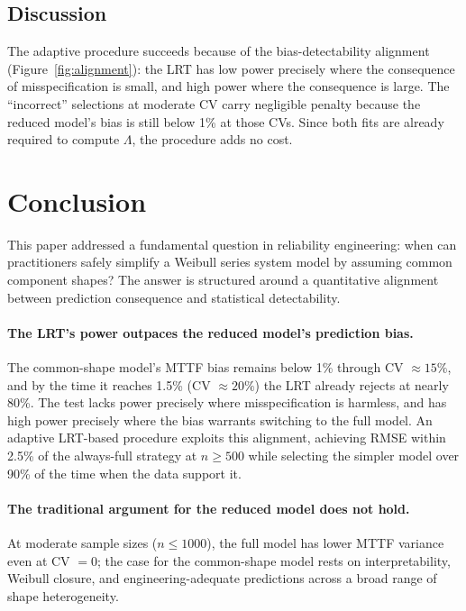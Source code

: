 \documentclass[11pt]{article}
\begin{document}
\subsection{Discussion}

The adaptive procedure succeeds because of the bias-detectability alignment (Figure~\ref{fig:alignment}): the LRT has low power precisely where the consequence of misspecification is small, and high power where the consequence is large. The ``incorrect'' selections at moderate CV carry negligible penalty because the reduced model's bias is still below 1\% at those CVs. Since both fits are already required to compute $\Lambda$, the procedure adds no cost.

\section{Conclusion}
\label{sec:conclusion}

This paper addressed a fundamental question in reliability engineering: when can practitioners safely simplify a Weibull series system model by assuming common component shapes? The answer is structured around a quantitative alignment between prediction consequence and statistical detectability.

\paragraph{The LRT's power outpaces the reduced model's prediction bias.}
The common-shape model's MTTF bias remains below 1\% through CV $\approx 15\%$, and by the time it reaches 1.5\% (CV $\approx 20\%$) the LRT already rejects at nearly 80\%. The test lacks power precisely where misspecification is harmless, and has high power precisely where the bias warrants switching to the full model. An adaptive LRT-based procedure exploits this alignment, achieving RMSE within 2.5\% of the always-full strategy at $n \geq 500$ while selecting the simpler model over 90\% of the time when the data support it.

\paragraph{The traditional argument for the reduced model does not hold.}
At moderate sample sizes ($n \leq 1000$), the full model has lower MTTF variance even at CV $= 0$; the case for the common-shape model rests on interpretability, Weibull closure, and engineering-adequate predictions across a broad range of shape heterogeneity.
\end{document}
